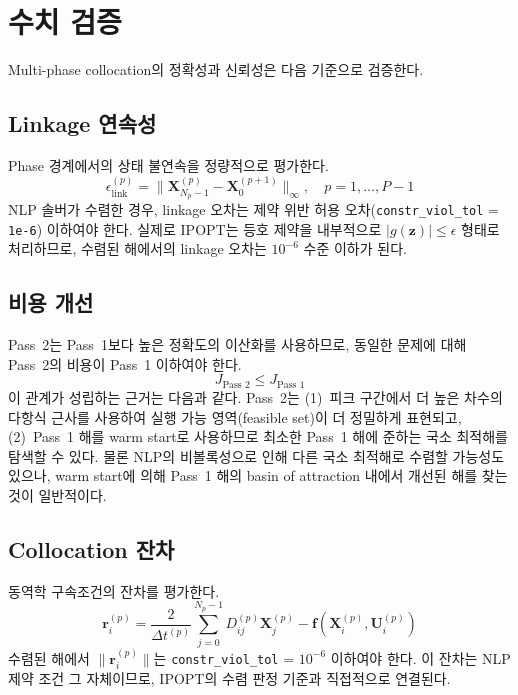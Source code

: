 \documentclass[11pt]{article}
\begin{document}
\section{수치 검증}
\label{sec:verification}

Multi-phase collocation의 정확성과 신뢰성은 다음 기준으로 검증한다.


\subsection{Linkage 연속성}
\label{sec:linkage_verification}

Phase 경계에서의 상태 불연속을 정량적으로 평가한다.
\[
\epsilon_\text{link}^{(p)} = \|\mathbf{X}_{N_p-1}^{(p)} - \mathbf{X}_0^{(p+1)}\|_\infty, \quad p = 1, \ldots, P-1
\]
NLP 솔버가 수렴한 경우, linkage 오차는 제약 위반 허용 오차(\texttt{constr\_viol\_tol} = \texttt{1e-6}) 이하여야 한다.
실제로 IPOPT는 등호 제약을 내부적으로 $|g(\mathbf{z})| \leq \epsilon$ 형태로 처리하므로, 수렴된 해에서의 linkage 오차는 $10^{-6}$ 수준 이하가 된다.


\subsection{비용 개선}
\label{sec:cost_improvement}

Pass~2는 Pass~1보다 높은 정확도의 이산화를 사용하므로, 동일한 문제에 대해 Pass~2의 비용이 Pass~1 이하여야 한다.
\[
J_{\text{Pass 2}} \leq J_{\text{Pass 1}}
\]
이 관계가 성립하는 근거는 다음과 같다.
Pass~2는 (1)~피크 구간에서 더 높은 차수의 다항식 근사를 사용하여 실행 가능 영역(feasible set)이 더 정밀하게 표현되고, (2)~Pass~1 해를 warm start로 사용하므로 최소한 Pass~1 해에 준하는 국소 최적해를 탐색할 수 있다.
물론 NLP의 비볼록성으로 인해 다른 국소 최적해로 수렴할 가능성도 있으나, warm start에 의해 Pass~1 해의 basin of attraction 내에서 개선된 해를 찾는 것이 일반적이다.


\subsection{Collocation 잔차}
\label{sec:collocation_residual}

동역학 구속조건의 잔차를 평가한다.
\begin{equation}
\label{eq:residual}
\mathbf{r}_i^{(p)} = \frac{2}{\Delta t^{(p)}} \sum_{j=0}^{N_p-1} D_{ij}^{(p)} \mathbf{X}_j^{(p)} - \mathbf{f}(\mathbf{X}_i^{(p)}, \mathbf{U}_i^{(p)})
\end{equation}
수렴된 해에서 $\|\mathbf{r}_i^{(p)}\|$는 \texttt{constr\_viol\_tol} = $10^{-6}$ 이하여야 한다.
이 잔차는 NLP 제약 조건 그 자체이므로, IPOPT의 수렴 판정 기준과 직접적으로 연결된다.
\end{document}
